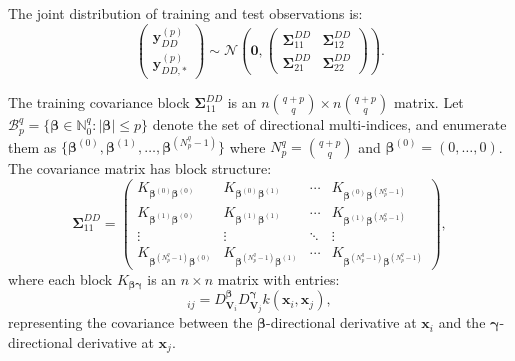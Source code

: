 \documentclass[12pt]{article}
\begin{document}
The joint distribution of training and test observations is:
\begin{equation}
	\label{eqn:ddgp_joint}
	\begin{pmatrix} 
		\mathbf{y}_{DD}^{(p)} \\ 
		\mathbf{y}_{DD,*}^{(p)} 
	\end{pmatrix} \sim 
	\mathcal{N}\left( 
	\mathbf{0}, 
	\begin{pmatrix} 
		\boldsymbol{\Sigma}_{11}^{DD} & \boldsymbol{\Sigma}_{12}^{DD} \\ 
		\boldsymbol{\Sigma}_{21}^{DD} & \boldsymbol{\Sigma}_{22}^{DD} 
	\end{pmatrix} 
	\right).
\end{equation}

The training covariance block $\boldsymbol{\Sigma}_{11}^{DD}$ is an $n\binom{q+p}{q} \times n\binom{q+p}{q}$ matrix. Let $\mathcal{B}_p^q = \{\boldsymbol{\beta} \in \mathbb{N}_0^q : |\boldsymbol{\beta}| \leq p\}$ denote the set of directional multi-indices, and enumerate them as $\{\boldsymbol{\beta}^{(0)}, \boldsymbol{\beta}^{(1)}, \ldots, \boldsymbol{\beta}^{(N_p^q-1)}\}$ where $N_p^q = \binom{q+p}{q}$ and $\boldsymbol{\beta}^{(0)} = (0,\ldots,0)$. The covariance matrix has block structure:
\begin{equation}
	\label{eqn:ddgp_S11}
	\boldsymbol{\Sigma}_{11}^{DD} =
	\begin{pmatrix} 
		K_{\boldsymbol{\beta}^{(0)}\boldsymbol{\beta}^{(0)}} & K_{\boldsymbol{\beta}^{(0)}\boldsymbol{\beta}^{(1)}} & \cdots & K_{\boldsymbol{\beta}^{(0)}\boldsymbol{\beta}^{(N_p^q-1)}} \\ 
		K_{\boldsymbol{\beta}^{(1)}\boldsymbol{\beta}^{(0)}} & K_{\boldsymbol{\beta}^{(1)}\boldsymbol{\beta}^{(1)}} & \cdots & K_{\boldsymbol{\beta}^{(1)}\boldsymbol{\beta}^{(N_p^q-1)}} \\ 
		\vdots & \vdots & \ddots & \vdots \\ 
		K_{\boldsymbol{\beta}^{(N_p^q-1)}\boldsymbol{\beta}^{(0)}} & K_{\boldsymbol{\beta}^{(N_p^q-1)}\boldsymbol{\beta}^{(1)}} & \cdots & K_{\boldsymbol{\beta}^{(N_p^q-1)}\boldsymbol{\beta}^{(N_p^q-1)}} 
	\end{pmatrix},
\end{equation}
where each block $K_{\boldsymbol{\beta}\boldsymbol{\gamma}}$ is an $n \times n$ matrix with entries:
\begin{equation}
	[K_{\boldsymbol{\beta}\boldsymbol{\gamma}}]_{ij} = D_{\mathbf{V}_i}^{\boldsymbol{\beta}} D_{\mathbf{V}_j}^{\boldsymbol{\gamma}} k(\mathbf{x}_i, \mathbf{x}_j),
\end{equation}
representing the covariance between the $\boldsymbol{\beta}$-directional derivative at $\mathbf{x}_i$ and the $\boldsymbol{\gamma}$-directional derivative at $\mathbf{x}_j$.
\end{document}
